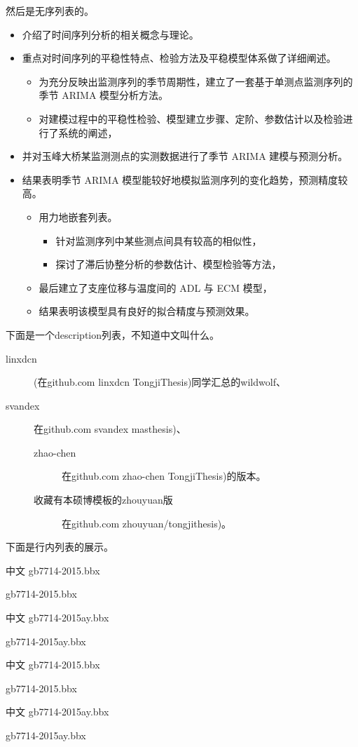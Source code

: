 \documentclass[../Main/thesis]{subfiles}
\begin{document}
然后是无序列表的。
\begin{itemize}
  \item 介绍了时间序列分析的相关概念与理论。
  \item 重点对时间序列的平稳性特点、检验方法及平稳模型体系做了详细阐述。
  \begin{itemize}
    \item 为充分反映出监测序列的季节周期性，建立了一套基于单测点监测序列的季节 ARIMA 模型分析方法。
    \item 对建模过程中的平稳性检验、模型建立步骤、定阶、参数估计以及检验进行了系统的阐述，
  \end{itemize}
  \item 并对玉峰大桥某监测测点的实测数据进行了季节 ARIMA 建模与预测分析。
  \item 结果表明季节 ARIMA 模型能较好地模拟监测序列的变化趋势，预测精度较高。
  \begin{itemize}
    \item 用力地嵌套列表。
    \begin{itemize}
      \item 针对监测序列中某些测点间具有较高的相似性，
      \item 探讨了滞后协整分析的参数估计、模型检验等方法，
    \end{itemize}
    \item 最后建立了支座位移与温度间的 ADL 与 ECM 模型，
    \item 结果表明该模型具有良好的拟合精度与预测效果。
  \end{itemize}
\end{itemize}

下面是一个description列表，不知道中文叫什么。

\begin{description}
  \item [linxdcn] (在github.com linxdcn TongjiThesis)同学汇总的wildwolf、
  \item [svandex] 在github.com svandex masthesis)、
  \begin{description}
    \item [zhao-chen] 在github.com zhao-chen TongjiThesis)的版本。
    \item [收藏有本硕博模板的zhouyuan版] 在github.com zhouyuan/tongjithesis)。
  \end{description}
\end{description}

\zhlipsum[33]

下面是行内列表的展示。

\begin{inline}[1)]
  \item 中文 gb7714-2015.bbx
  \item gb7714-2015.bbx
  \item 中文 gb7714-2015ay.bbx
  \item gb7714-2015ay.bbx
  \item 中文 gb7714-2015.bbx
  \item gb7714-2015.bbx
  \item 中文 gb7714-2015ay.bbx
  \item gb7714-2015ay.bbx
\end{inline}
\end{document}
